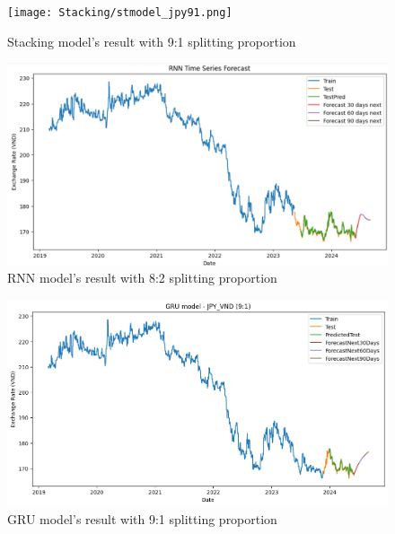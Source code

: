 \documentclass{ieeeojies}
\begin{document}
\begin{figure}[H]
  \centering
  \begin{minipage}{0.8\linewidth}
    \centering
    \texttt{[image: Stacking/stmodel\_jpy91.png]}
    \caption{Stacking model's result with 9:1 splitting proportion}
    \label{fig29}
  \end{minipage}
\end{figure}
\begin{figure}[H]
  \centering
  \begin{minipage}{0.8\linewidth}
    \centering
    \includegraphics[width=\linewidth]{RNN/rnn_jpy_82.png}
    \caption{RNN model's result with 8:2 splitting proportion}
    \label{fig30}
  \end{minipage}
\end{figure}
\begin{figure}[H]
  \centering
  \begin{minipage}{0.8\linewidth}
    \centering
    \includegraphics[width=\linewidth]{GRU/GRU_jpy_91.png}
    \caption{GRU model's result with 9:1 splitting proportion}
    \label{fig31}
  \end{minipage}
\end{figure}
\end{document}
